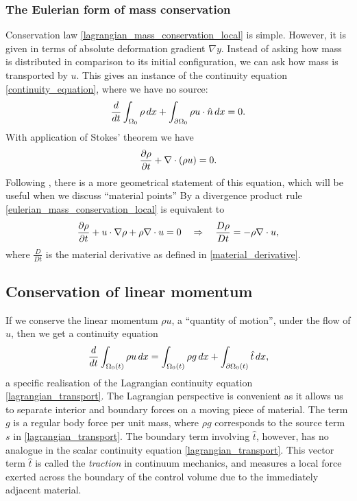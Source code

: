 \subsubsection{The Eulerian form of mass conservation}
Conservation law \eqref{lagrangian_mass_conservation_local} is simple. However, it is given in terms of absolute deformation gradient $\nabla y$.
Instead of asking how mass is distributed
in comparison to its initial configuration, we can ask how mass is transported by $u$.
This gives an instance of the continuity equation \eqref{continuity_equation}, where we have no source:
\begin{equation}\label{eulerian_mass_conservation}
    \frac{d}{dt} \int_{{\Omega_0}} \rho \,dx + \int_{{\partial\Omega_0}} \rho u\cdot \hat{n}\,dx = 0.
\end{equation}
With application of Stokes' theorem we have
\begin{equation}\label{eulerian_mass_conservation_local}
    \frac{\partial \rho}{\partial t} + \nabla \cdot (\rho u) = 0.
\end{equation}
Following \cite{leal}, there is a more geometrical statement of this equation, which will be useful when
we discuss ``material points''
By a divergence product rule \eqref{eulerian_mass_conservation_local} is equivalent to
\begin{equation}\label{eulerian_mass_conservation_local_material}
    \frac{\partial \rho}{\partial t} + u\cdot\nabla\rho + \rho\nabla\cdot u = 0
    \quad\Rightarrow\quad \frac{D\rho}{Dt} = -\rho\nabla\cdot u,
\end{equation}
where $\frac{D}{Dt}$ is the material derivative as defined in \eqref{material_derivative}.

\subsection{Conservation of linear momentum}
If we conserve the linear momentum $\rho u$, a ``quantity of motion'', under the flow of $u$, then we get a continuity equation
\begin{equation}\label{cauchy_continuity_traction}
    \frac{d}{dt}\int_{\Omega_0(t)}\rho u\,dx = \int_{{\Omega_0}(t)} \rho g\,dx + \int_{{\partial\Omega_0}(t)}\hat{t}\,dx,
\end{equation}
a specific realisation of the Lagrangian continuity equation \eqref{lagrangian_transport}. The Lagrangian perspective is convenient
as it allows us to separate interior and boundary forces on a moving piece of material. The term $g$ is a regular body force per unit mass, where $\rho g$ corresponds to
the source term $s$ in \eqref{lagrangian_transport}. The boundary term involving $\hat{t}$, however, has no analogue in the scalar continuity equation
\eqref{lagrangian_transport}.
This vector term $\hat{t}$ is called the \textit{traction} in continuum mechanics, and measures a local force exerted across the boundary
of the control volume due to the immediately adjacent material.

